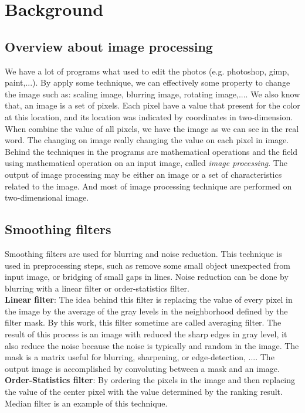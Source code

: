 \chapter{Background}\section{Overview about image processing}
We have a lot of programs what used to edit the photos (e.g. photoshop, gimp, paint,...). By apply some technique, we can effectively some property to change the image such as: scaling image, blurring image, rotating image,.... We also know that, an image is a set of pixels. Each pixel have a value that present for the color at this location, and its location was indicated by coordinates in two-dimension. When combine the value of all pixels, we have the image as we can see in the real word. The changing on image really changing the value on each pixel in image. Behind the techniques in the programs are mathematical operations and the field using mathematical operation on an input image,  called \textit{image processing}. The output of image processing may be either an image or a set of characteristics related to the image. And most of image processing technique are performed on two-dimensional image.
\section{Smoothing filters}
Smoothing filters are used for blurring and noise reduction. This technique is used in preprocessing steps, such as remove some small object unexpected from input image, or bridging of small gaps in lines. Noise reduction can be done by blurring with a linear filter or order-statistics filter.\\[0.2cm]
\textbf{Linear filter}: The idea behind this filter is replacing the value of every pixel in the image by the average of the gray levels in the neighborhood defined by the filter mask. By this work, this filter sometime are called averaging filter. The result of this process is an image with reduced the sharp edges in gray level, it also reduce the noise because the noise is typically and random in the image. The mask is a matrix useful for blurring, sharpening, or edge-detection, .... The output image is accomplished by convoluting between a mask and an image.\\[0.2cm]
\textbf{Order-Statistics filter}: By ordering the pixels in the image and then replacing the value of the center pixel with the value determined by the ranking result. Median filter is an example of this technique.
